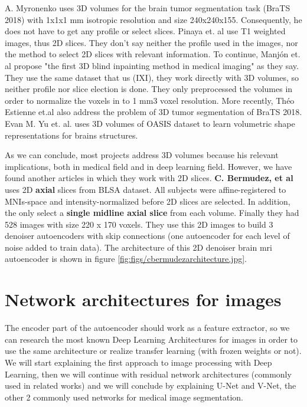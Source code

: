 A. Myronenko \cite{myronenko20183d} uses 3D volumes for the brain tumor segmentation task (BraTS 2018) with 1x1x1 mm isotropic resolution and size 240x240x155. Consequently, he does not have to get any profile or select slices. Pinaya et. al \cite{pinaya2019} use T1 weighted images, thus 2D slices. They don't say neither the profile used in the images, nor the method to select 2D slices with relevant information. To continue, Manjón et. al \cite{2020inpainting} propose "the first 3D blind inpainting method in medical imaging" as they say. They use the same dataset that us (IXI), they work directly with 3D volumes, so neither profile nor slice election is done. They only preprocessed the volumes in order to normalize the voxels in to 1 mm3 voxel resolution. More recently, Théo Estienne et.al \cite{otherBraTS2020} also address the problem of 3D tumor segmentation of BraTS 2018. Evan M. Yu et. al. \cite{learnvolrepreCODE} uses 3D volumes of OASIS dataset to learn volumetric shape representations for brains structures.

As we can conclude, most projects address 3D volumes because his relevant implications, both in medical field and in deep learning field. However, we have found another articles in which they work with 2D slices. \textbf{C. Bermudez, et al} \cite{bermudez2018t1autoencoder} uses 2D \textbf{axial} slices from BLSA dataset. All subjects were affine-registered to MNIs-space and intensity-normalized before 2D slices are selected. In addition, the only select a \textbf{single midline axial slice} from each volume. Finally they had 528 images with size 220 x 170 voxels. They use this 2D images to build 3 denoiser autoencoders with skip connections (one autoencoder for each level of noise added to train data). The architecture of this 2D denoiser brain mri autoencoder is shown in figure \ref{fig:figs/cbermudezarchitecture.jpg}.


\FloatBarrier
\clearpage



\section{Network architectures for images}

The encoder part of the autoencoder should work as a feature extractor, so we can research the most known Deep Learning Architectures for images in order to use the same architecture or realize transfer learning (with frozen weights or not). We will start explaining the first approach to image processing with Deep Learning, then we will continue with residual network architectures (commonly used in related works) and we will conclude by explaining U-Net and V-Net, the other 2 commonly used networks for medical image segmentation.

